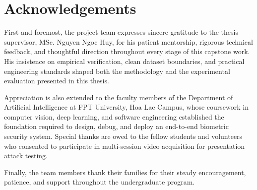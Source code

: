 \chapter*{Acknowledgements}

First and foremost, the project team expresses sincere gratitude to the thesis supervisor, MSc. Nguyen Ngoc Huy, for his patient mentorship, rigorous technical feedback, and thoughtful direction throughout every stage of this capstone work. His insistence on empirical verification, clean dataset boundaries, and practical engineering standards shaped both the methodology and the experimental evaluation presented in this thesis.

Appreciation is also extended to the faculty members of the Department of Artificial Intelligence at FPT University, Hoa Lac Campus, whose coursework in computer vision, deep learning, and software engineering established the foundation required to design, debug, and deploy an end-to-end biometric security system. Special thanks are owed to the fellow students and volunteers who consented to participate in multi-session video acquisition for presentation attack testing.

Finally, the team members thank their families for their steady encouragement, patience, and support throughout the undergraduate program.
